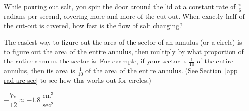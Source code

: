\begin{question}
\begin{center}
\hspace{2cm}
\end{center}

While pouring out salt, you spin the door around the lid at a constant rate of $\frac{\pi}{6}$ radians per second, covering more and more of the cut-out. When exactly half of the cut-out is covered, how fast is the flow of salt changing?
\end{question}
\begin{hint}
The easiest way to figure out the area of the sector of an annulus (or a circle) is to
figure out the area of the entire annulus, then multiply by what proportion of the entire annulus the sector is. For example, if your sector is $\frac{1}{10}$ of the entire annulus, then its area is $\frac{1}{10}$ of the area of the entire annulus. (See Section~\ref*{app rad arc sec} %
to  see how this works out for circles.)
\end{hint}
\begin{answer}
$-\dfrac{7\pi}{12}\approx -1.8~\dfrac{\mathrm{cm}^3}{\mathrm{sec}^2}$
\end{answer}
